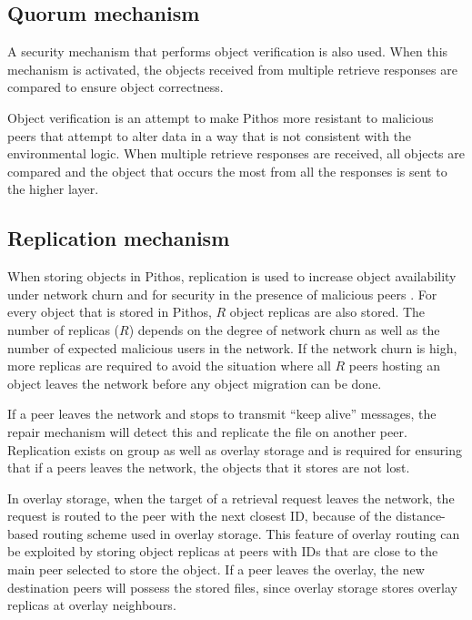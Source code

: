 \subsection{Quorum mechanism}
\label{quorum}

A security mechanism that performs object verification is also used. When this mechanism is activated, the objects received from multiple retrieve responses are compared to ensure object correctness.

Object verification is an attempt to make Pithos more resistant to malicious peers that attempt to alter data in a way that is not consistent with the environmental logic. When multiple retrieve responses are received, all objects are compared and the object that occurs the most from all the responses is sent to the higher layer.

\subsection{Replication mechanism}

When storing objects in Pithos, replication is used to increase object availability under network churn and for security in the presence of malicious peers \cite{storage_and_chaching_PAST}. For every object that is stored in Pithos, $R$ object replicas are also stored. The number of replicas ($R$) depends on the degree of network churn as well as the number of expected malicious users in the network. If the network churn is high, more replicas are required to avoid the situation where all $R$ peers hosting an object leaves the network before any object migration can be done.

If a peer leaves the network and stops to transmit ``keep alive'' messages, the repair mechanism will detect this and replicate the file on another peer. Replication exists on group as well as overlay storage and is required for ensuring that if a peers leaves the network, the objects that it stores are not lost.

In overlay storage, when the target of a retrieval request leaves the network, the request is routed to the peer with the next closest ID, because of the distance-based routing scheme used in overlay storage. This feature of overlay routing can be exploited by storing object replicas at peers with IDs that are close to the main peer selected to store the object. If a peer leaves the overlay, the new destination peers will possess the stored files, since overlay storage stores overlay replicas at overlay neighbours.

